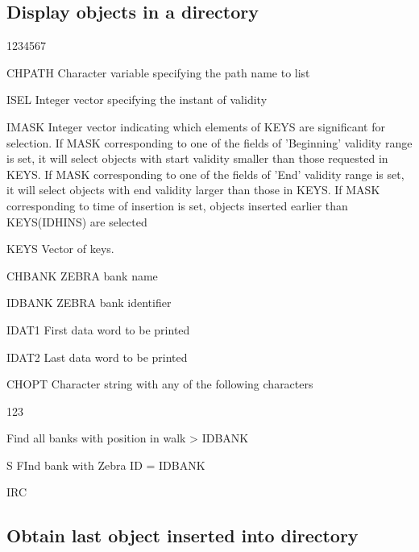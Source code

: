 \subsection{Display objects in a directory}
\begin{DLtt}{1234567}
\item[CHPATH]Character variable specifying the path name to list
\item[ISEL]Integer vector specifying the instant of validity
\item[IMASK]Integer vector indicating which elements of KEYS are
significant for selection. If MASK corresponding to
one of the fields of 'Beginning' validity range is set,
it will select objects with start validity smaller than
those requested in KEYS. If MASK corresponding to one
of the fields of 'End' validity range is set, it will
select objects with end validity larger than those in
KEYS. If MASK corresponding to time of insertion is set,
objects inserted earlier than KEYS(IDHINS) are selected
\item[KEYS]Vector of keys.
\item[CHBANK]ZEBRA bank name
\item[IDBANK]ZEBRA bank identifier
\item[IDAT1]First data word to be printed
\item[IDAT2]Last data word to be printed
\item[CHOPT]Character string with any of the following characters
  \begin{DLtt}{123}
  \item[ ]Find all banks with position in walk > IDBANK
  \item[S]FInd bank with Zebra ID = IDBANK
  \end{DLtt}
\item[IRC]
\end{DLtt}

\subsection{Obtain last object inserted into directory}


